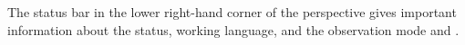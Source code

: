 
The status bar in the lower right-hand corner of the perspective gives important 
information about the \gdagent status, working language,  \gdaut{} and the observation mode and \gdomm{}. 




